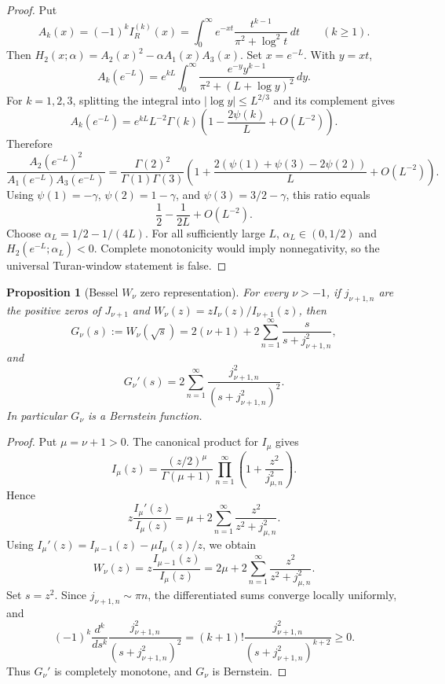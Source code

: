 \documentclass[11pt]{article}
\numberwithin{equation}{section}
\newtheorem{proposition}[theorem]{Proposition}
\theoremstyle{definition}
\theoremstyle{remark}
\newcommand{\1}{\mathbf 1}
\begin{document}
\begin{proof}
Put
\[
A_k(x)=(-1)^k I_R^{(k)}(x)
=\int_0^\infty e^{-xt}\frac{t^{k-1}}{\pi^2+\log^2 t}\,dt
\qquad (k\ge1).
\]
Then \(H_2(x;\alpha)=A_2(x)^2-\alpha A_1(x)A_3(x)\).  Set \(x=e^{-L}\).  With \(y=xt\),
\[
A_k(e^{-L})
=e^{kL}\int_0^\infty
\frac{e^{-y}y^{k-1}}{\pi^2+(L+\log y)^2}\,dy.
\]
For \(k=1,2,3\), splitting the integral into \(|\log y|\le L^{2/3}\) and its complement gives
\[
A_k(e^{-L})
=e^{kL}L^{-2}\Gamma(k)
\left(1-\frac{2\psi(k)}{L}+O(L^{-2})\right).
\]
Therefore
\[
\frac{A_2(e^{-L})^2}{A_1(e^{-L})A_3(e^{-L})}
=\frac{\Gamma(2)^2}{\Gamma(1)\Gamma(3)}
\left(
1+\frac{2(\psi(1)+\psi(3)-2\psi(2))}{L}+O(L^{-2})
\right).
\]
Using \(\psi(1)=-\gamma\), \(\psi(2)=1-\gamma\), and \(\psi(3)=3/2-\gamma\), this ratio equals
\[
\frac12-\frac{1}{2L}+O(L^{-2}).
\]
Choose \(\alpha_L=1/2-1/(4L)\).  For all sufficiently large \(L\), \(\alpha_L\in(0,1/2)\) and \(H_2(e^{-L};\alpha_L)<0\).  Complete monotonicity would imply nonnegativity, so the universal Turan-window statement is false.
\end{proof}


\begin{proposition}[Bessel \(W_\nu\) zero representation]
\label{res:yt-bessel-w-general-zero-partial-fraction}
For every \(\nu>-1\), if \(j_{\nu+1,n}\) are the positive zeros of \(J_{\nu+1}\) and \(W_\nu(z)=zI_\nu(z)/I_{\nu+1}(z)\), then
\[
G_\nu(s):=W_\nu(\sqrt s)=2(\nu+1)+2\sum_{n=1}^\infty\frac{s}{s+j_{\nu+1,n}^2},
\]
and
\[
G_\nu'(s)=2\sum_{n=1}^\infty\frac{j_{\nu+1,n}^2}{(s+j_{\nu+1,n}^2)^2}.
\]
In particular \(G_\nu\) is a Bernstein function.
\end{proposition}

\begin{proof}
Put \(\mu=\nu+1>0\).  The canonical product for \(I_\mu\) gives
\[
I_\mu(z)=\frac{(z/2)^\mu}{\Gamma(\mu+1)}\prod_{n=1}^\infty\left(1+\frac{z^2}{j_{\mu,n}^2}\right).
\]
Hence
\[
z\frac{I_\mu'(z)}{I_\mu(z)}=\mu+2\sum_{n=1}^\infty\frac{z^2}{z^2+j_{\mu,n}^2}.
\]
Using \(I_\mu'(z)=I_{\mu-1}(z)-\mu I_\mu(z)/z\), we obtain
\[
W_\nu(z)=z\frac{I_{\mu-1}(z)}{I_\mu(z)}=2\mu+2\sum_{n=1}^\infty\frac{z^2}{z^2+j_{\mu,n}^2}.
\]
Set \(s=z^2\).  Since \(j_{\nu+1,n}\sim\pi n\), the differentiated sums converge locally uniformly, and
\[
(-1)^k\frac{d^k}{ds^k}
\frac{j_{\nu+1,n}^2}{(s+j_{\nu+1,n}^2)^2}
=(k+1)!\frac{j_{\nu+1,n}^2}{(s+j_{\nu+1,n}^2)^{k+2}}\ge0.
\]
Thus \(G_\nu'\) is completely monotone, and \(G_\nu\) is Bernstein.
\end{proof}
\end{document}
